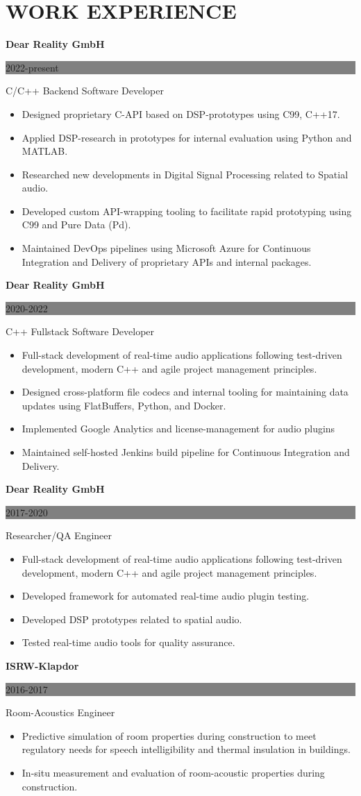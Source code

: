 \documentclass[paper=a4,fontsize=9pt]{scrartcl}
\newcommand{\sepspace}{\vspace*{1em}}
\newcommand{\NewPart}[1]{\section*{\uppercase{#1}}}
\newcommand{\ExperienceEntry}[4]{
	\noindent \textbf{#1} \hfill
	\colorbox{Grey}{
		\parbox{6em}{
		\hfill\color{White}#2}} \par
	\noindent #3 \par
    \noindent \small #4
	\normalsize \par
}
\begin{document}
\NewPart{Work Experience}{}
\ExperienceEntry{Dear Reality GmbH}{2022-present}{C/C++ Backend Software Developer}{
    \begin{itemize}[itemsep=0pt, topsep=1pt, leftmargin=1.2em]
        \item Designed proprietary C-API based on DSP-prototypes using C99, C++17.
        \item Applied DSP-research in prototypes for internal evaluation using Python and MATLAB.
        \item Researched new developments in Digital Signal Processing related to Spatial audio.
        \item Developed custom API-wrapping tooling to facilitate rapid prototyping using C99 and Pure Data (Pd).
        \item Maintained DevOps pipelines using Microsoft Azure for Continuous Integration and Delivery of proprietary APIs and internal packages.
    \end{itemize}
}
\sepspace
\ExperienceEntry{Dear Reality GmbH}{2020-2022}{C++ Fullstack Software Developer}{
    \begin{itemize}[itemsep=0pt, topsep=1pt, leftmargin=1.2em]
        \item Full-stack development of real-time audio applications following test-driven development, modern C++ and agile project management principles.
        \item Designed cross-platform file codecs and internal tooling for maintaining data updates using FlatBuffers, Python, and Docker.
        \item Implemented Google Analytics and license-management for audio plugins
        \item Maintained self-hosted Jenkins build pipeline for Continuous Integration and Delivery.
    \end{itemize}
}
\sepspace
\ExperienceEntry{Dear Reality GmbH}{2017-2020}{Researcher/QA Engineer}{
    \begin{itemize}[itemsep=0pt, topsep=1pt, leftmargin=1.2em]
        \item Full-stack development of real-time audio applications following test-driven development, modern C++ and agile project management principles.
        \item Developed framework for automated real-time audio plugin testing.
        \item Developed DSP prototypes related to spatial audio.
        \item Tested real-time audio tools for quality assurance.
    \end{itemize}
}
\sepspace
\ExperienceEntry{ISRW-Klapdor}{2016-2017}{Room-Acoustics Engineer}{
    \begin{itemize}[itemsep=0pt, topsep=1pt, leftmargin=1.2em]
        \item Predictive simulation of room properties during construction to meet regulatory needs for speech intelligibility and thermal insulation in buildings.
        \item In-situ measurement and evaluation of room-acoustic properties during construction.
    \end{itemize}
}
\end{document}
